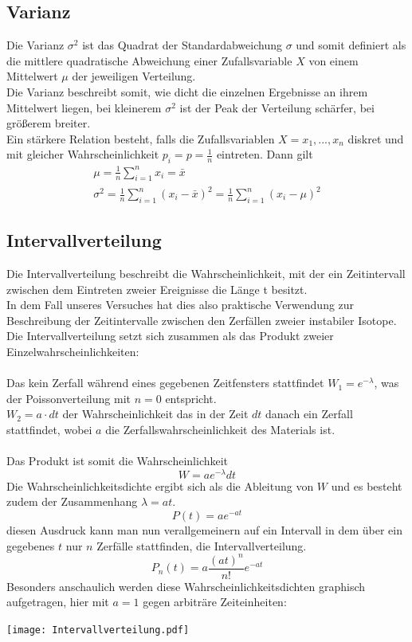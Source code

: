 \documentclass{article}
\begin{document}
	\subsection{Varianz}
	Die Varianz $\sigma^2$ ist das Quadrat der Standardabweichung $\sigma$ und somit definiert als die mittlere quadratische Abweichung einer Zufallsvariable $X$ von einem Mittelwert $\mu$ der jeweiligen Verteilung.\\
	Die Varianz beschreibt somit, wie dicht die einzelnen Ergebnisse an ihrem Mittelwert liegen, bei kleinerem $\sigma^2$ ist der Peak der Verteilung schärfer, bei größerem breiter.\\
	Ein stärkere Relation besteht, falls die Zufallsvariablen $X={x_1,...,x_n}$ diskret und mit gleicher Wahrscheinlichkeit $p_i=p=\frac{1}{n}$ eintreten. Dann gilt
	\begin{gather}
	\mu=\frac{1}{n}\sum_{i=1}^{n}x_i=\bar{x}\\
	\sigma^2=\frac{1}{n}\sum_{i=1}^{n}(x_i-\bar{x})^2=\frac{1}{n}\sum_{i=1}^{n}(x_i-\mu)^2
	\end{gather} 
	\subsection{Intervallverteilung}
	Die Intervallverteilung beschreibt die Wahrscheinlichkeit, mit der ein Zeitintervall zwischen dem Eintreten zweier Ereignisse die Länge t besitzt.\\
	In dem Fall unseres Versuches hat dies also praktische Verwendung zur Beschreibung der Zeitintervalle zwischen den Zerfällen zweier instabiler Isotope.\\
	Die Intervallverteilung setzt sich zusammen als das Produkt zweier Einzelwahrscheinlichkeiten:\\\\
	Das kein Zerfall während eines gegebenen Zeitfensters stattfindet $W_1=e^{-\lambda}$, was der Poissonverteilung mit $n=0$ entspricht.\\
	$W_2=a\cdot dt$ der Wahrscheinlichkeit das in der Zeit $dt$ danach ein Zerfall stattfindet, wobei $a$ die Zerfallswahrscheinlichkeit des Materials ist.\\\\
	Das Produkt ist somit die Wahrscheinlichkeit
	\begin{equation}
	W=ae^{-\lambda}dt
	\end{equation}
	Die Wahrscheinlichkeitsdichte ergibt sich als die Ableitung von $W$ und es besteht zudem der Zusammenhang $\lambda=at$.
	\begin{equation}
	P(t)=ae^{-at}
	\end{equation}
	diesen Ausdruck kann man nun verallgemeinern auf ein Intervall in dem über ein gegebenes $t$ nur $n$ Zerfälle stattfinden, die Intervallverteilung.
	\begin{equation}
	P_n(t)=a\frac{(at)^n}{n!}e^{-at}
	\end{equation} 
	Besonders anschaulich werden diese Wahrscheinlichkeitsdichten graphisch aufgetragen, hier mit $a=1$ gegen arbiträre Zeiteinheiten:
	\begin{center}
	\texttt{[image: Intervallverteilung.pdf]}
	\end{center} 
\end{document}
